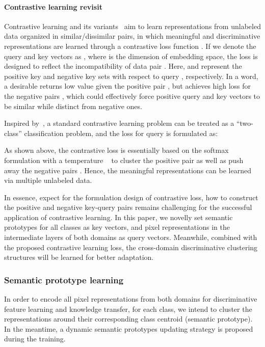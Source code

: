 \documentclass[runningheads]{llncs}
\begin{document}
\paragraph{Contrastive learning revisit} 
Contrastive learning and its variants~\cite{hadsell2006dimensionality,he2020momentum,oord2018infoNCE} aim to learn representations from unlabeled data organized in similar/dissimilar pairs, in which meaningful and discriminative representations are learned through a contrastive loss function . If we denote the query and key vectors as , where  is the dimension of embedding space, the loss  is designed to reflect the incompatibility of data pair . Here,  and  represent the positive key and negative key sets with respect to query , respectively. In a word, a desirable  returns low value given the positive pair , but achieves high loss for the negative pairs , which could effectively force positive query and key vectors to be similar while distinct from negative ones. 

Inspired by~\cite{oord2018infoNCE}, a standard contrastive learning problem can be treated as a ``two-class'' classification problem, and the loss for query  is formulated as:
 \begin{small}
    
\end{small}As shown above, the contrastive loss is essentially based on the softmax formulation with a temperature ~\cite{ge2020contrastive,park2020contrastive,oord2018infoNCE} to cluster the positive pair  as well as push away the negative pairs . Hence, the meaningful representations can be learned via multiple unlabeled data. 

In essence, expect for the formulation design of contrastive loss, how to construct the positive and negative key-query pairs remains challenging for the successful application of contrastive learning. In this paper, we novelly set semantic prototypes for all classes as key vectors, and pixel representations in the intermediate layers of both domains as query vectors. Meanwhile, combined with the proposed contrastive learning loss, the cross-domain discriminative clustering structures will be learned for better adaptation.

\subsubsection{Semantic prototype learning}
\label{sec:semantic_prototypes}
In order to encode all pixel representations from both domains for discriminative feature learning and knowledge transfer, for each class, we intend to cluster the representations around their corresponding class centroid (semantic prototype). In the meantime, a dynamic semantic prototypes updating strategy is proposed during the training.
\end{document}
